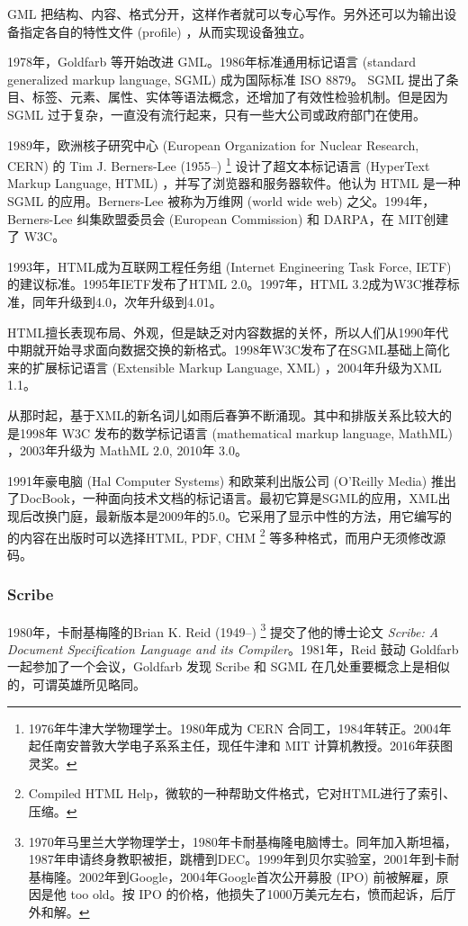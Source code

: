 GML 把结构、内容、格式分开，这样作者就可以专心写作。另外还可以为输出设备指定各自的特性文件 (profile) ，从而实现设备独立。

1978年，Goldfarb 等开始改进 GML。1986年标准通用标记语言 (standard generalized markup language, SGML) 成为国际标准 ISO 8879。 SGML 提出了条目、标签、元素、属性、实体等语法概念，还增加了有效性检验机制。但是因为 SGML 过于复杂，一直没有流行起来，只有一些大公司或政府部门在使用。

1989年，欧洲核子研究中心 (European Organization for Nuclear Research, CERN)\indexCERN{} 的 Tim J. Berners-Lee (1955--)\indexBernersLee{} \footnote{1976年牛津大学物理学士。1980年成为 CERN 合同工，1984年转正。2004年起任南安普敦大学电子系系主任，现任牛津和 MIT 计算机教授。2016年获图灵奖。} 设计了超文本标记语言 (HyperText Markup Language, HTML) ，并写了浏览器和服务器软件。他认为 HTML 是一种 SGML 的应用。Berners-Lee 被称为万维网 (world wide web) 之父。1994年，Berners-Lee 纠集欧盟委员会 (European Commission) \indexEC 和 DARPA\indexDARPA{}，在 MIT\indexMIT 创建了 W3C\indexWWWC。

1993年，HTML成为互联网工程任务组 (Internet Engineering Task Force, IETF)\indexIETF{} 的建议标准。1995年IETF发布了HTML 2.0。1997年，HTML 3.2成为W3C推荐标准，同年升级到4.0，次年升级到4.01。

HTML擅长表现布局、外观，但是缺乏对内容数据的关怀，所以人们从1990年代中期就开始寻求面向数据交换的新格式。1998年W3C发布了在SGML基础上简化来的扩展标记语言 (Extensible Markup Language, XML) ，2004年升级为XML 1.1。

从那时起，基于XML的新名词儿如雨后春笋不断涌现。其中和排版关系比较大的是1998年 W3C 发布的数学标记语言 (mathematical markup language, MathML) ，2003年升级为 MathML 2.0, 2010年 3.0。

1991年豪电脑 (Hal Computer Systems)\indexHal{} 和欧莱利出版公司 (O'Reilly Media)\indexOreilly{} 推出了DocBook，一种面向技术文档的标记语言。最初它算是SGML的应用，XML出现后改换门庭，最新版本是2009年的5.0。它采用了显示中性的方法，用它编写的的内容在出版时可以选择HTML, PDF, CHM \footnote{Compiled HTML Help，微软的一种帮助文件格式，它对HTML进行了索引、压缩。} 等多种格式，而用户无须修改源码。

\subsubsection{Scribe}

1980年，卡耐基梅隆的Brian K. Reid (1949--)\indexReid{} \footnote{1970年马里兰大学物理学士，1980年卡耐基梅隆电脑博士。同年加入斯坦福，1987年申请终身教职被拒，跳槽到DEC。1999年到贝尔实验室\indexBell{}，2001年到卡耐基梅隆。2002年到Google，2004年Google首次公开募股 (IPO) 前被解雇，原因是他 too old。按 IPO 的价格，他损失了1000万美元左右，愤而起诉，后厅外和解。} 提交了他的博士论文 \emph{Scribe: A Document Specification Language and its Compiler}。1981年，Reid 鼓动 Goldfarb 一起参加了一个会议，Goldfarb 发现 Scribe 和 SGML 在几处重要概念上是相似的，可谓英雄所见略同。

